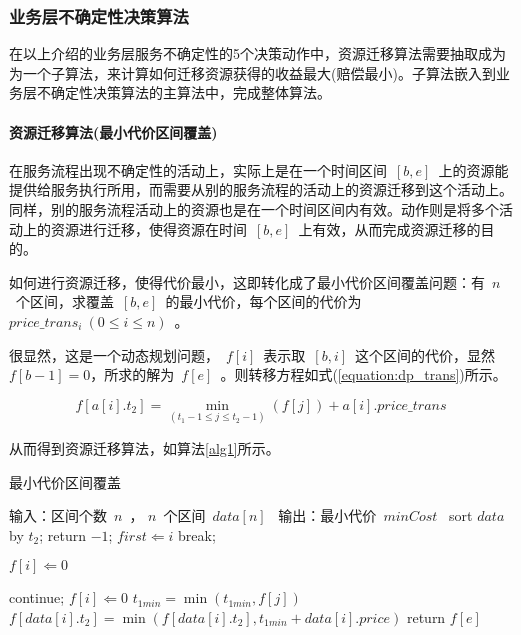 \subsubsection{业务层不确定性决策算法}

在以上介绍的业务层服务不确定性的5个决策动作中，资源迁移算法需要抽取成为为一个子算法，来计算如何迁移资源获得的收益最大(赔偿最小)。子算法嵌入到业务层不确定性决策算法的主算法中，完成整体算法。

\setcounter{paragraph}{0}
\paragraph{资源迁移算法(最小代价区间覆盖)}

在服务流程出现不确定性的活动上，实际上是在一个时间区间~$[b,e]$~上的资源能提供给服务执行所用，而需要从别的服务流程的活动上的资源迁移到这个活动上。同样，别的服务流程活动上的资源也是在一个时间区间内有效。动作则是将多个活动上的资源进行迁移，使得资源在时间~$[b,e]$~上有效，从而完成资源迁移的目的。

如何进行资源迁移，使得代价最小，这即转化成了最小代价区间覆盖问题：有~$n$~个区间，求覆盖~$[b,e]$~的最小代价，每个区间的代价为~$price\_trans_i ~(0 \le i \le n)$~。

很显然，这是一个动态规划问题，~$f[i]$~表示取~$[b,i]$~这个区间的代价，显然~$f[b-1]=0$，所求的解为~$f[e]$~。则转移方程如式(\ref{equation:dp_trans})所示。

\begin{equation}\label{equation:dp_trans}
f[a[i].{t_2}] = \mathop {\min }\limits_{({t_1} - 1 \le j \le {t_2} - 1)} (f[j]) + a[i].price\_trans
\end{equation}

从而得到资源迁移算法，如算法\ref{alg1}所示。
%
%

\begin{algorithm}
    \caption{最小代价区间覆盖}
    \label{alg1}
    \begin{algorithmic}
        \STATE 输入：区间个数~$n$~， $n$~个区间~$data[n]$~
        \STATE 输出：最小代价~$minCost$~
        \STATE sort $data$ by $t_2$;
            \STATE return $-1$;
        \ENDIF
            \STATE $first \Leftarrow i$
            \STATE break;
            \ENDIF
        \ENDFOR
        
            \STATE $f[i] \Leftarrow 0$
        \ENDFOR
        
                \STATE continue;
            \ENDIF
                \STATE $f[i] \Leftarrow 0$
                \STATE $t_{1min} = \min(t_{1min}, f[j])$
            \ENDFOR
            \STATE $f[data[i].t_2] = \min (f[data[i].t_2], t_{1min} + data[i].price)$
        \ENDFOR
        \STATE return $f[e]$

    \end{algorithmic}
\end{algorithm}

